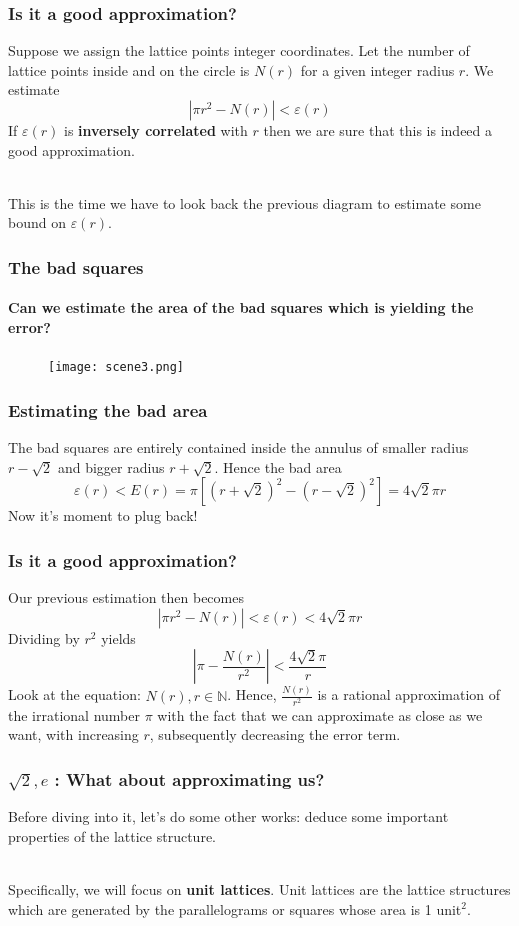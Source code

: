 \documentclass{beamer}
\begin{document}
    \begin{frame}
        \frametitle{Is it a good approximation?}
        Suppose we assign the lattice points integer coordinates. Let the number of lattice points inside and on the circle is \(N(r)\) for a given integer radius \(r\). \pause We estimate \[|\pi r^2 - N(r)| < \varepsilon(r)\] \pause If \(\varepsilon(r)\) is \textbf{inversely correlated} with \(r\) then we are sure that this is indeed a good approximation. \\~\\ \pause

        This is the time we have to look back the previous diagram to estimate some bound on \(\varepsilon(r)\).
    \end{frame}

    \begin{frame}
        \frametitle{The bad squares}
        \framesubtitle{Can we estimate the area of the bad squares which is yielding the error?}
        \begin{figure}
            \texttt{[image: scene3.png]}
        \end{figure}
    \end{frame}

    \begin{frame}
        \frametitle{Estimating the bad area}
        The bad squares are entirely contained inside the annulus of smaller radius \(r - \sqrt{2}\) and bigger radius \(r + \sqrt{2}\). Hence the bad area \[\varepsilon(r) < E(r) = \pi [(r+\sqrt{2})^2 - (r-\sqrt{2})^2] = 4 \sqrt{2} \pi r\] Now it's moment to plug back!
    \end{frame}

    \begin{frame}
        \frametitle{Is it a good approximation?}
        Our previous estimation then becomes \[|\pi r^2 - N(r)| < \varepsilon(r) < 4 \sqrt{2} \pi r\] \pause Dividing by \(r^2\) yields \[\left|\pi - \frac{N(r)}{r^2}\right| < \frac{4 \sqrt{2} \pi}{r}\] \pause Look at the equation: \(N(r), r \in \mathbb{N}\). Hence, \(\frac{N(r)}{r^2}\) is a rational approximation of the irrational number \(\pi\) with the fact that we can approximate as close as we want, with increasing \(r\), subsequently decreasing the error term.
    \end{frame}

    \begin{frame}
        \frametitle{\(\sqrt{2}, e\) : What about approximating us?}

        Before diving into it, let's do some other works: deduce some important properties of the lattice structure. \\~\\ \pause

        Specifically, we will focus on \textbf{unit lattices}. Unit lattices are the lattice structures which are generated by the parallelograms or squares whose area is 1 unit\(^2\). 
    \end{frame}
\end{document}
